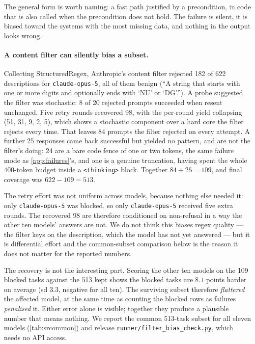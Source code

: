 \documentclass[11pt]{article}
\begin{document}
\begin{enumerate}
The general form is worth naming: a fast path justified by a precondition,
in code that is also called when the precondition does not hold. The failure
is silent, it is biased toward the systems with the most missing data, and
nothing in the output looks wrong.
\end{enumerate}

\paragraph{A content filter can silently bias a subset.}
Collecting StructuredRegex, Anthropic's content filter rejected 182 of 622
descriptions for \texttt{claude-opus-5}, all of them benign (``A string that
starts with one or more digits and optionally ends with `NU' or `DG'.'').
A probe suggested the filter was stochastic: 8 of 20 rejected prompts
succeeded when resent unchanged. Five retry rounds recovered 98, with the
per-round yield collapsing (51, 31, 9, 2, 5), which shows a stochastic
component over a hard core the filter rejects every time. That leaves 84
prompts the filter rejected on every attempt. A further 25 responses came back
successful but yielded no pattern, and are not the filter's doing: 24 are a
bare code fence of one or two tokens, the same failure mode as
\cref{app:failures}'s, and one is a genuine truncation, having spent the whole
400-token budget inside a \texttt{<thinking>} block. Together
$84 + 25 = 109$, and final coverage was $622 - 109 = 513$.

The retry effort was not uniform across models, because nothing else needed
it: only \texttt{claude-opus-5} was blocked, so only \texttt{claude-opus-5}
received five extra rounds. The recovered 98 are therefore conditioned on
non-refusal in a way the other ten models' answers are not. We do not think
this biases regex quality --- the filter keys on the description, which the
model has not yet answered --- but it is differential effort and the
common-subset comparison below is the reason it does not matter for the
reported numbers.

The recovery is not the interesting part. Scoring the other ten models on the
109 blocked tasks against the 513 kept shows the blocked tasks are
$8.1$ points harder on average (sd $3.3$, negative for all ten). The
surviving subset therefore \emph{flattered} the affected model, at the same
time as counting the blocked rows as failures \emph{penalised} it. Either
error alone is visible; together they produce a plausible number that means
nothing. We report the common 513-task subset for all eleven models
(\cref{tab:srcommon}) and release \texttt{runner/filter\_bias\_check.py},
which needs no API access.
\end{document}
